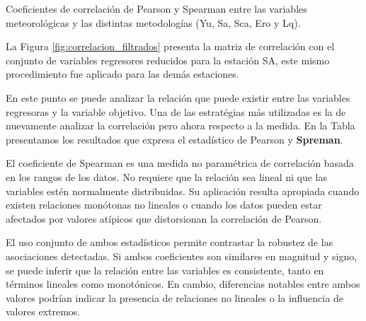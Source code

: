 \documentclass[letterpaper,12pt, twoside]{report}
\providecommand{\DIFdeltex}[1]{{\protect\color{red} \scriptsize #1}} %
\providecommand{\DIFdelFL}[1]{\DIFdel{#1}} %
\providecommand{\DIFdel}[1]{\texorpdfstring{\DIFdeltex{#1}}{}} %
\begin{document}
{%
\DIFdelFL{Coeficientes de correlación de Pearson y Spearman entre las variables meteorológicas y las distintas metodologías (Yu, Sa, Sca, Ero y Lq).}}

\DIFdel{La Figura \ref{fig:correlacion_filtrados} presenta la matriz de correlación con el conjunto de variables regresores reducidos para la estación SA, este mismo procedimiento fue aplicado para las demás estaciones.
}%

\DIFdel{En este punto se puede analizar la relación que puede existir entre las variables regresoras y la variable objetivo. Una de las estratégias más utilizadas es la de nuevamente analizar la correlación pero ahora respecto a la medida. En la Tabla presentamos los resultados que expresa el estadístico de Pearson y \textbf{Spreman}. }%

\DIFdel{El coeficiente de Spearman \citep{Spearman1904} es una medida no paramétrica de correlación basada en los rangos de los datos. No requiere que la relación sea lineal ni que las variables estén normalmente distribuidas. Su aplicación resulta apropiada cuando existen relaciones monótonas no lineales o cuando los datos pueden estar afectados por valores atípicos que distorsionan la correlación de Pearson.
}%

\DIFdel{El uso conjunto de ambos estadísticos permite contrastar la robustez de las asociaciones detectadas. Si ambos coeficientes son similares en magnitud y signo, se puede inferir que la relación entre las variables es consistente, tanto en términos lineales como monotónicos. En cambio, diferencias notables entre ambos valores podrían indicar la presencia de relaciones no lineales o la influencia de valores extremos.}%
\end{document}
